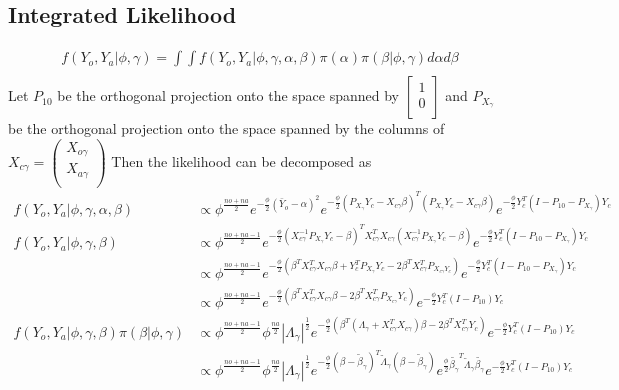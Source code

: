 \documentclass[9pt]{article}
\begin{document}
\subsection*{Integrated Likelihood}
\label{sub:integrated_likelihood}
\begin{align*}
	f(Y_{o},Y_{a}|\phi,\gamma)=\int \int f(Y_{o},Y_{a}|\phi,\gamma,\alpha,\beta)\pi(\alpha)\pi(\beta|\phi,\gamma)d\alpha d\beta \\
\end{align*}
Let $P_{10}$ be the orthogonal projection onto the space spanned by $\begin{bmatrix}
	1\\
	0\\
\end{bmatrix}$ and $P_{X_{\gamma}}$ be the orthogonal projection onto the space spanned by the columns of $X_{c\gamma}=\begin{pmatrix}
	X_{o\gamma}\\
	X_{a\gamma}\\
\end{pmatrix}$
Then the likelihood can be decomposed as 
\begin{align*}
	f(Y_{o},Y_{a}|\phi,\gamma,\alpha,\beta)&\propto \phi^{\frac{no+na}{2}}e^{-\frac{\phi}{2}(\bar{Y}_{o}-\alpha)^{2}}e^{-\frac{\phi}{2}(P_{X_{\gamma}}Y_{c}-X_{c\gamma}\beta)^{T}(P_{X_{\gamma}}Y_{c}-X_{c\gamma}\beta)}e^{-\frac{\phi}{2}Y_{c}^{T}(I-P_{10}-P_{X_{\gamma}})Y_{c}}\\
	f(Y_{o},Y_{a}|\phi,\gamma,\beta)&\propto \phi^{\frac{no+na-1}{2}}e^{-\frac{\phi}{2}(X_{c\gamma}^{-1}P_{X_{\gamma}}Y_{c}-\beta)^{T}X_{c\gamma}^{T}X_{c\gamma}(X_{c\gamma}^{-1}P_{X_{\gamma}}Y_{c}-\beta)}e^{-\frac{\phi}{2}Y_{c}^{T}(I-P_{10}-P_{X_{\gamma}})Y_{c}}\\
	&\propto \phi^{\frac{no+na-1}{2}}e^{-\frac{\phi}{2}(\beta^{T}X_{c\gamma}^{T}X_{c\gamma}\beta+Y_{c}^{T}P_{X_{\gamma}}Y_{c}-2\beta^{T}X_{c\gamma}^{T}P_{X_{c\gamma}Y_{c}})}e^{-\frac{\phi}{2}Y_{c}^{T}(I-P_{10}-P_{X_{\gamma}})Y_{c}}\\
	&\propto \phi^{\frac{no+na-1}{2}}e^{-\frac{\phi}{2}(\beta^{T}X_{c\gamma}^{T}X_{c\gamma}\beta-2\beta^{T}X_{c\gamma}^{T}P_{X_{c\gamma}}Y_{c})}e^{-\frac{\phi}{2}Y_{c}^{T}(I-P_{10})Y_{c}}\\
	f(Y_{o},Y_{a}|\phi,\gamma,\beta)\pi(\beta|\phi,\gamma)	&\propto \phi^{\frac{no+na-1}{2}}\phi^{\frac{na}{2}}|\Lambda_{\gamma}|^{\frac{1}{2}}e^{-\frac{\phi}{2}(\beta^{T}(\Lambda_{\gamma}+X_{c\gamma}^{T}X_{c\gamma})\beta-2\beta^{T}X_{c\gamma}^{T}Y_{c})}e^{-\frac{\phi}{2}Y_{c}^{T}(I-P_{10})Y_{c}}\\
	&\propto \phi^{\frac{no+na-1}{2}}\phi^{\frac{na}{2}}|\Lambda_{\gamma}|^{\frac{1}{2}}e^{-\frac{\phi}{2}(\beta-\tilde{\beta}_{\gamma})^{T}\tilde{\Lambda}_{\gamma}(\beta-\tilde{\beta}_{\gamma})}e^{\frac{\phi}{2}\tilde{\beta_{\gamma}}^{T}\tilde{\Lambda}_{\gamma}\tilde{\beta_{\gamma}}}e^{-\frac{\phi}{2}Y_{c}^{T}(I-P_{10})Y_{c}}\\
\end{align*}
\end{document}
